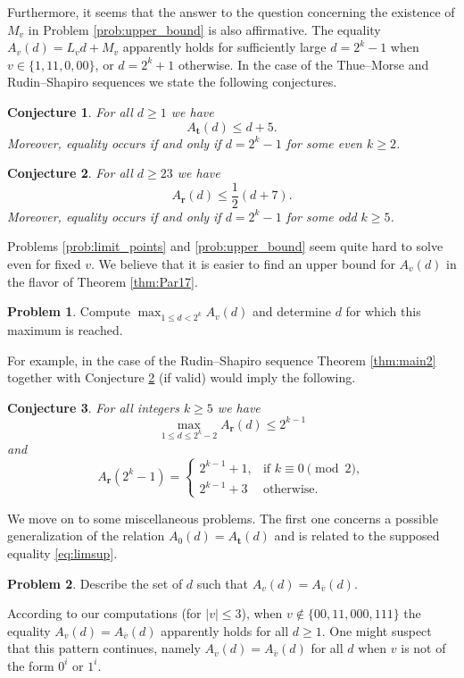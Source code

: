 \documentclass[a4paper,11pt]{amsart}
\newtheorem{con}{Conjecture}
\theoremstyle{definition}
\newtheorem{prob}{Problem}
\begin{document}
Furthermore, it seems that the answer to the question concerning the existence of $M_v$ in Problem \ref{prob:upper_bound} is also affirmative. The equality $A_v(d) = L_v d + M_v$ apparently holds for sufficiently large $d=2^k-1$ when $v \in \{1,11,0,00\}$, or $d=2^k+1$ otherwise. In the case of the Thue--Morse and Rudin--Shapiro sequences we state the following conjectures. 

\begin{con} \label{con:TM_bound}
For all $d \geq 1$ we have
$$ A_{\mathbf{t}}(d) \leq d+5. $$
Moreover, equality occurs if and only if $d=2^k-1$ for some even $k \geq 2$.
\end{con}

\begin{con} \label{con:RS_bound}
For all $d \geq 23$ we have
$$ A_{\mathbf{r}}(d) \leq \frac{1}{2}(d+7). $$
Moreover, equality occurs if and only if $d=2^k-1$ for some odd $k \geq 5$.
\end{con}


Problems \ref{prob:limit_points} and \ref{prob:upper_bound} seem quite hard to solve even for fixed $v$.
We believe that it is easier to find an upper bound for $A_v(d)$ in the flavor of Theorem \ref{thm:Par17}. 

\begin{prob}
Compute $\max_{1 \leq d < 2^k} A_v(d)$ and determine $d$ for which this maximum is reached.
\end{prob}

For example, in the case of the Rudin--Shapiro sequence Theorem \ref{thm:main2} together with Conjecture \ref{con:RS_bound} (if valid) would imply the following. 

\begin{con}
For all integers $k \geq 5$ we have
$$  \max_{1 \leq d \leq 2^k-2} A_{\mathbf{r}}(d)  \leq  2^{k-1}$$
and
$$   A_{\mathbf{r}}(2^k-1) =  \begin{cases}
2^{k-1} + 1, &\text{if } k \equiv 0 \pmod{2},\\
2^{k-1} + 3 &\text{otherwise}.
\end{cases} $$
\end{con}

We move on to some miscellaneous problems. The first one concerns a possible generalization of the relation $A_0(d) = A_{\mathbf{t}}(d)$ and is related to the supposed equality \eqref{eq:limsup}.
\begin{prob}
Describe the set of $d$ such that $A_v(d) = A_{\overline{v}}(d)$.
\end{prob}
According to our computations (for $|v| \leq 3$), when $v \not\in \{00,11,000,111\}$ the equality $A_v(d) = A_{\overline{v}}(d)$ apparently holds for all $d \geq 1$. One might suspect that this pattern continues, namely $A_v(d) = A_{\overline{v}}(d)$ for all $d$ when $v$ is not of the form $0^i$ or $1^i$.   
\end{document}
